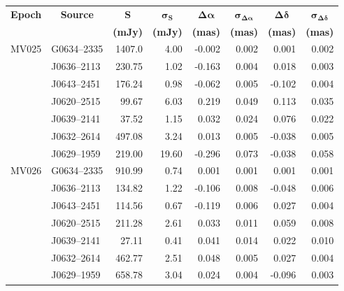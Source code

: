 \begin{table}[h]
	\footnotesize
	\centering
	\onehalfspacing
		\begin{tabular}{llrrrrrr} 
			\toprule
			\multicolumn{1}{c}{\bf Epoch} &
			\multicolumn{1}{c}{\bf Source} & 
			\multicolumn{1}{c}{ $\boldsymbol{S}$} & 
			\multicolumn{1}{c}{ $\boldsymbol{\sigma_S}$} & 
			\multicolumn{1}{c}{ $\boldsymbol{\Delta\alpha}$ } &
			\multicolumn{1}{c}{ $\boldsymbol{\sigma_{\Delta\alpha}}$ } & 
			\multicolumn{1}{c}{ $\boldsymbol{\Delta\delta}$ } &
			\multicolumn{1}{c}{ $\boldsymbol{\sigma_{\Delta\delta}}$ } \\
			\multicolumn{1}{c}{} & 
			\multicolumn{1}{c}{} & 
			\multicolumn{1}{c}{ \textbf{(mJy)} }&
			\multicolumn{1}{c}{ \textbf{(mJy)} }&
			\multicolumn{1}{c}{ \textbf{(mas)} }&
			\multicolumn{1}{c}{ \textbf{(mas)} }&
			\multicolumn{1}{c}{ \textbf{(mas)} }&
			\multicolumn{1}{c}{ \textbf{(mas)} }\\
			\midrule
			MV025 &G0634--2335 & 1407.0 & 4.00   &   -0.002  & 0.002   &    0.001 &  0.002  \\ 
			&J0636--2113 & 230.75 & 1.02   &   -0.163  & 0.004   &    0.018 &  0.003  \\ 
			&J0643--2451 & 176.24 & 0.98   &   -0.062  & 0.005   &   -0.102 &  0.004  \\ 
			&J0620--2515 &  99.67 & 6.03   &    0.219  & 0.049   &    0.113 &  0.035  \\ 
			&J0639--2141 &  37.52 & 1.15   &    0.032  & 0.024   &    0.076 &  0.022  \\ 
			&J0632--2614 & 497.08 & 3.24   &    0.013  & 0.005   &   -0.038 &  0.005  \\ 
			&J0629--1959 & 219.00 &19.60   &   -0.296  & 0.073   &   -0.038 &  0.058  \\ \hline
			MV026 &G0634--2335 & 910.99 & 0.74   &    0.001  & 0.001   &    0.001 &  0.001  \\ 
			&J0636--2113 & 134.82 & 1.22   &   -0.106  & 0.008   &   -0.048 &  0.006  \\ 
			&J0643--2451 & 114.56 & 0.67   &   -0.119  & 0.006   &    0.027 &  0.004  \\ 
			&J0620--2515 & 211.28 & 2.61   &    0.033  & 0.011   &    0.059 &  0.008  \\ 
			&J0639--2141 &  27.11 & 0.41   &    0.041  & 0.014   &    0.022 &  0.010  \\ 
			&J0632--2614 & 462.77 & 2.51   &    0.048  & 0.005   &    0.027 &  0.004  \\ 
			&J0629--1959 & 658.78 & 3.04   &    0.024  & 0.004   &   -0.096 &  0.003  \\ \hline

\end{tabular}
\end{table}
